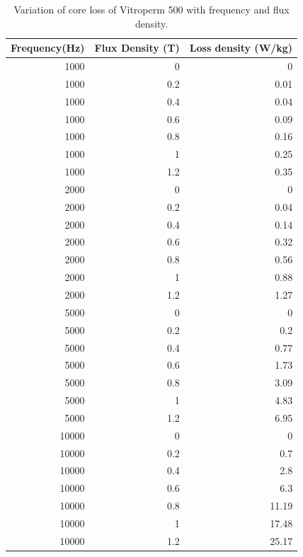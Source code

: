 \documentclass[a4paper, 11pt]{article} %
\begin{document}
\begin{table}[]
\begin{center}
\begin{tabular}{rrr}
Frequency(Hz) & Flux Density (T) & Loss density (W/kg) \\
\hline
1000 & 0 & 0 \\
1000 & 0.2 & 0.01 \\
1000 & 0.4 & 0.04 \\
1000 & 0.6 & 0.09 \\
1000 & 0.8 & 0.16 \\
1000 & 1 & 0.25 \\
1000 & 1.2 & 0.35 \\
\hline
2000 & 0 & 0 \\
2000 & 0.2 & 0.04 \\
2000 & 0.4 & 0.14 \\
2000 & 0.6 & 0.32 \\
2000 & 0.8 & 0.56 \\
2000 & 1 & 0.88 \\
2000 & 1.2 & 1.27 \\
\hline
5000 & 0 & 0 \\
5000 & 0.2 & 0.2 \\
5000 & 0.4 & 0.77 \\
5000 & 0.6 & 1.73 \\
5000 & 0.8 & 3.09 \\
5000 & 1 & 4.83 \\
5000 & 1.2 & 6.95 \\
\hline
10000 & 0 & 0 \\
10000 & 0.2 & 0.7 \\
10000 & 0.4 & 2.8 \\
10000 & 0.6 & 6.3 \\
10000 & 0.8 & 11.19 \\
10000 & 1 & 17.48 \\
10000 & 1.2 & 25.17 \\
\hline
\end{tabular} 
\end{center}
\caption{Variation of core loss of Vitroperm 500 with frequency and flux density.}
\label{core_loss_vs_freq_B}
\end{table}



\clearpage


\end{document}
